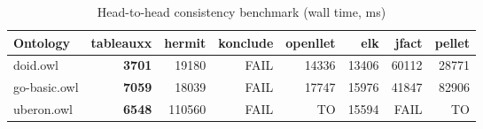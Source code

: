 \begin{table}[t]
\centering
\caption{Head-to-head consistency benchmark (wall time, ms)}
\label{tab:head_to_head_wall_ms}
\begin{tabular}{lrrrrrrr}
\toprule
Ontology & tableauxx & hermit & konclude & openllet & elk & jfact & pellet \\
\midrule
doid.owl & \textbf{3701} & 19180 & FAIL & 14336 & 13406 & 60112 & 28771 \\
go-basic.owl & \textbf{7059} & 18039 & FAIL & 17747 & 15976 & 41847 & 82906 \\
uberon.owl & \textbf{6548} & 110560 & FAIL & TO & 15594 & FAIL & TO \\
\bottomrule
\end{tabular}
\end{table}
